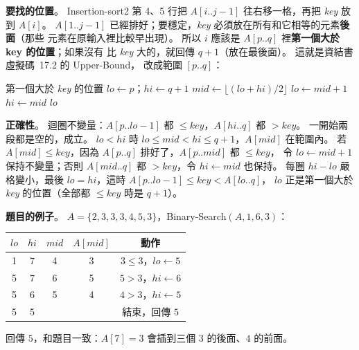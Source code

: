 \begin{pastsoln}
\textbf{要找的位置}。 Insertion-sort2 第 4、5 行把 $A[i..j-1]$ 往右移一格，再把 \textit{key} 放到
$A[i]$。 $A[1..j-1]$ 已經排好；要穩定，\textit{key} 必須放在所有和它相等的元素\textbf{後面}（那些
元素在原輸入裡比較早出現）。 所以 $i$ 應該是 $A[p..q]$ 裡\textbf{第一個大於 key 的位置}；如果沒有
比 \textit{key} 大的，就回傳 $q + 1$（放在最後面）。 這就是資結書虛擬碼~17.2 的 Upper-Bound，
改成範圍 $[p..q]$：

\begin{pseudo}{第一個大於 \textit{key} 的位置}
    \State $\mathit{lo} \gets p$；$\mathit{hi} \gets q + 1$
        \State $\mathit{mid} \gets \lfloor (\mathit{lo} + \mathit{hi}) / 2 \rfloor$
            \State $\mathit{lo} \gets \mathit{mid} + 1$
        \Else
            \State $\mathit{hi} \gets \mathit{mid}$
        \EndIf
    \EndWhile
    \State \Return $\mathit{lo}$
\EndFunction
\end{pseudo}

\textbf{正確性}。 迴圈不變量：$A[p..\mathit{lo}-1]$ 都 $\le \mathit{key}$，$A[\mathit{hi}..q]$ 都
$> \mathit{key}$。 一開始兩段都是空的，成立。 $\mathit{lo} < \mathit{hi}$ 時
$\mathit{lo} \le \mathit{mid} < \mathit{hi} \le q + 1$，$A[\mathit{mid}]$ 在範圍內。 若
$A[\mathit{mid}] \le \mathit{key}$，因為 $A[p..q]$ 排好了，$A[p..\mathit{mid}]$ 都 $\le \mathit{key}$，
令 $\mathit{lo} \gets \mathit{mid} + 1$ 保持不變量；否則 $A[\mathit{mid}..q]$ 都 $> \mathit{key}$，令
$\mathit{hi} \gets \mathit{mid}$ 也保持。 每圈 $\mathit{hi} - \mathit{lo}$ 嚴格變小，最後
$\mathit{lo} = \mathit{hi}$，這時 $A[p..\mathit{lo}-1] \le \mathit{key} < A[\mathit{lo}..q]$，
$\mathit{lo}$ 正是第一個大於 \textit{key} 的位置（全部都 $\le \mathit{key}$ 時是 $q + 1$）。

\textbf{題目的例子}。 $A = \{2, 3, 3, 3, 4, 5, 3\}$，Binary-Search$(A, 1, 6, 3)$：
\begin{center}
\begin{tabular}{ccccc}
\toprule
$\mathit{lo}$ & $\mathit{hi}$ & $\mathit{mid}$ & $A[\mathit{mid}]$ & 動作 \\
\midrule
1 & 7 & 4 & 3 & $3 \le 3$，$\mathit{lo} \gets 5$ \\
5 & 7 & 6 & 5 & $5 > 3$，$\mathit{hi} \gets 6$ \\
5 & 6 & 5 & 4 & $4 > 3$，$\mathit{hi} \gets 5$ \\
5 & 5 & & & 結束，回傳 $5$ \\
\bottomrule
\end{tabular}
\end{center}
回傳 $5$，和題目一致：$A[7] = 3$ 會插到三個 $3$ 的後面、$4$ 的前面。


\end{pastsoln}
